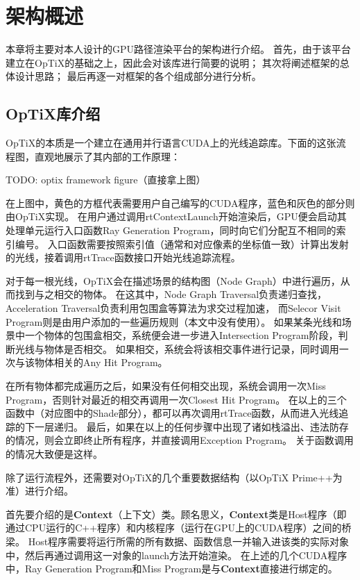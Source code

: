 \chapter{架构概述}
\label{cha:pipeline}

本章将主要对本人设计的GPU路径渲染平台的架构进行介绍。
首先，由于该平台建立在OpTiX的基础之上，因此会对该库进行简要的说明；
其次将阐述框架的总体设计思路；
最后再逐一对框架的各个组成部分进行分析。

\section{OpTiX库介绍}

OpTiX的本质是一个建立在通用并行语言CUDA上的光线追踪库。下面的这张流程图，直观地展示了其内部的工作原理：

TODO: optix framework figure（直接拿上图）

在上图中，黄色的方框代表需要用户自己编写的CUDA程序，蓝色和灰色的部分则由OpTiX实现。
在用户通过调用rtContextLaunch开始渲染后，GPU便会启动其处理单元运行入口函数Ray Generation Program，同时向它们分配互不相同的索引编号。
入口函数需要按照索引值（通常和对应像素的坐标值一致）计算出发射的光线，接着调用rtTrace函数接口开始光线追踪流程。

对于每一根光线，OpTiX会在描述场景的结构图（Node Graph）中进行遍历，从而找到与之相交的物体。
在这其中，Node Graph Traversal负责递归查找，Acceleration Traversal负责利用包围盒等算法为求交过程加速，
而Selecor Visit Program则是由用户添加的一些遍历规则（本文中没有使用）。
如果某条光线和场景中一个物体的包围盒相交，系统便会进一步进入Intersection Program阶段，判断光线与物体是否相交。
如果相交，系统会将该相交事件进行记录，同时调用一次与该物体相关的Any Hit Program。

在所有物体都完成遍历之后，如果没有任何相交出现，系统会调用一次Miss Program，否则针对最近的相交再调用一次Closest Hit Program。
在以上的三个函数中（对应图中的Shade部分），都可以再次调用rtTrace函数，从而进入光线追踪的下一层递归。
最后，如果在以上的任何步骤中出现了诸如栈溢出、违法防存的情况，则会立即终止所有程序，并直接调用Exception Program。
关于函数调用的情况大致便是这样。

除了运行流程外，还需要对OpTiX的几个重要数据结构（以OpTiX Prime++为准）进行介绍。

首先要介绍的是\textbf{Context}（上下文）类。顾名思义，\textbf{Context}类是Host程序（即通过CPU运行的C++程序）和内核程序（运行在GPU上的CUDA程序）之间的桥梁。
Host程序需要将运行所需的所有数据、函数信息一并输入进该类的实际对象中，然后再通过调用这一对象的launch方法开始渲染。
在上述的几个CUDA程序中，Ray Generation Program和Miss Program是与\textbf{Context}直接进行绑定的。

